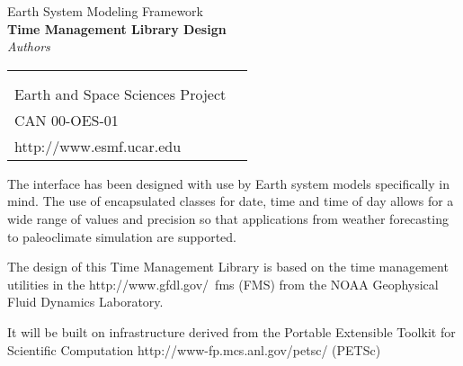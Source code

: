 \documentclass[]{article}
\begin{document}

\begin{titlepage}

\begin{center}
{\Large Earth System Modeling Framework } \\
\vspace{.25in}
{\Large {\bf Time Management Library Design}} \\
\vspace{.25in}
{\large {\it Authors}}
\vspace{.5in}
\end{center}

\begin{latexonly}
\vspace{5.5in}
\begin{tabular}{p{5in}p{.9in}}
\hrulefill \\
\noindent {\bf NASA High Performance Computing and Communications Program} \\
\noindent Earth and Space Sciences Project \\
\noindent CAN 00-OES-01 \\
\noindent http://www.esmf.ucar.edu \\
\end{tabular}
\end{latexonly}

\end{titlepage}

\tableofcontents

\newpage


The interface has been designed with use by Earth system models specifically in mind. The use of encapsulated classes for date, time and time of day  
allows for a wide range of values and precision so that applications from weather forecasting to paleoclimate 
simulation are supported.  

The design of this Time Management Library is based on the time management 
utilities in the 
{http://www.gfdl.gov/~fms} (FMS) from the NOAA Geophysical 
Fluid Dynamics Laboratory.

It will be built on infrastructure derived from the \htmladdnormallink
{Portable Extensible Toolkit for Scientific Computation}
{http://www-fp.mcs.anl.gov/petsc/} (PETSc)
\end{document}
